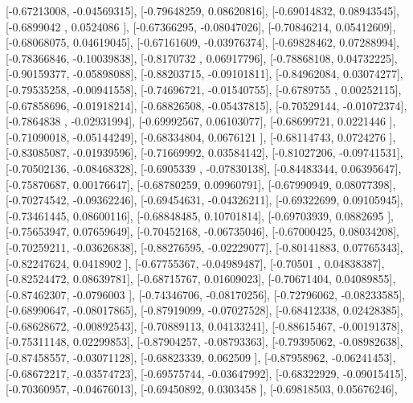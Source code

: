 \documentclass{article}
\begin{document}
       [-0.67213008, -0.04569315],
       [-0.79648259,  0.08620816],
       [-0.69014832,  0.08943545],
       [-0.6899042 ,  0.0524086 ],
       [-0.67366295, -0.08047026],
       [-0.70846214,  0.05412609],
       [-0.68068075,  0.04619045],
       [-0.67161609, -0.03976374],
       [-0.69828462,  0.07288994],
       [-0.78366846, -0.10039838],
       [-0.8170732 ,  0.06917796],
       [-0.78868108,  0.04732225],
       [-0.90159377, -0.05898088],
       [-0.88203715, -0.09101811],
       [-0.84962084,  0.03074277],
       [-0.79535258, -0.00941558],
       [-0.74696721, -0.01540755],
       [-0.6789755 ,  0.00252115],
       [-0.67858696, -0.01918214],
       [-0.68826508, -0.05437815],
       [-0.70529144, -0.01072374],
       [-0.7864838 , -0.02931994],
       [-0.69992567,  0.06103077],
       [-0.68699721,  0.0221446 ],
       [-0.71090018, -0.05144249],
       [-0.68334804,  0.0676121 ],
       [-0.68114743,  0.0724276 ],
       [-0.83085087, -0.01939596],
       [-0.71669992,  0.03584142],
       [-0.81027206, -0.09741531],
       [-0.70502136, -0.08468328],
       [-0.6905339 , -0.07830138],
       [-0.84483344,  0.06395647],
       [-0.75870687,  0.00176647],
       [-0.68780259,  0.09960791],
       [-0.67990949,  0.08077398],
       [-0.70274542, -0.09362246],
       [-0.69454631, -0.04326211],
       [-0.69322699,  0.09105945],
       [-0.73461445,  0.08600116],
       [-0.68848485,  0.10701814],
       [-0.69703939,  0.0882695 ],
       [-0.75653947,  0.07659649],
       [-0.70452168, -0.06735046],
       [-0.67000425,  0.08034208],
       [-0.70259211, -0.03626838],
       [-0.88276595, -0.02229077],
       [-0.80141883,  0.07765343],
       [-0.82247624,  0.0418902 ],
       [-0.67755367, -0.04989487],
       [-0.70501   ,  0.04838387],
       [-0.82524472,  0.08639781],
       [-0.68715767,  0.01609023],
       [-0.70671404,  0.04089855],
       [-0.87462307, -0.0796003 ],
       [-0.74346706, -0.08170256],
       [-0.72796062, -0.08233585],
       [-0.68990647, -0.08017865],
       [-0.87919099, -0.07027528],
       [-0.68412338,  0.02428385],
       [-0.68628672, -0.00892543],
       [-0.70889113,  0.04133241],
       [-0.88615467, -0.00191378],
       [-0.75311148,  0.02299853],
       [-0.87904257, -0.08793363],
       [-0.79395062, -0.08982638],
       [-0.87458557, -0.03071128],
       [-0.68823339,  0.062509  ],
       [-0.87958962, -0.06241453],
       [-0.68672217, -0.03574723],
       [-0.69575744, -0.03647992],
       [-0.68322929, -0.09015415],
       [-0.70360957, -0.04676013],
       [-0.69450892,  0.0303458 ],
       [-0.69818503,  0.05676246],
\end{document}
